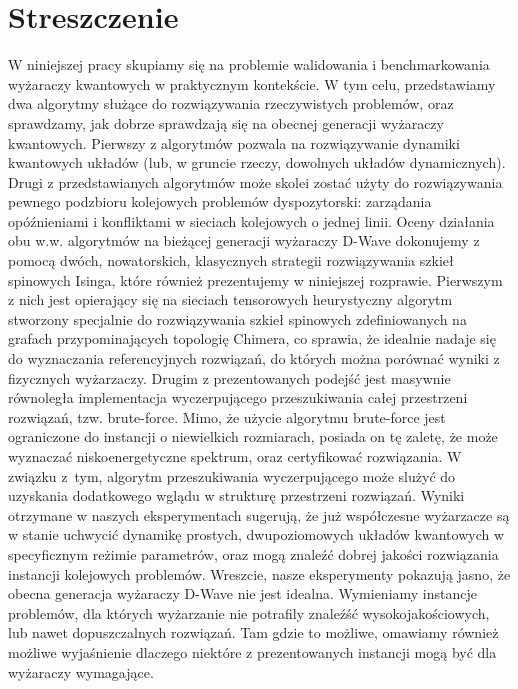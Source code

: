\chapter{Streszczenie}

\begin{otherlanguage}{polish}
  W niniejszej pracy skupiamy się na problemie walidowania i benchmarkowania
  wyżaraczy kwantowych w praktycznym kontekście. W tym celu, przedstawiamy dwa
  algorytmy służące do rozwiązywania rzeczywistych problemów, oraz sprawdzamy,
  jak dobrze sprawdzają się na obecnej generacji wyżaraczy kwantowych. Pierwszy z
  algorytmów pozwala na rozwiązywanie dynamiki kwantowych układów (lub, w gruncie
  rzeczy, dowolnych układów dynamicznych). Drugi z przedstawianych algorytmów
  może skolei zostać użyty do rozwiązywania pewnego podzbioru kolejowych
  problemów dyspozytorski: zarządania opóźnieniami i konfliktami w sieciach
  kolejowych o jednej linii. Oceny działania obu w.w. algorytmów na bieżącej
  generacji wyżaraczy D-Wave dokonujemy z pomocą dwóch, nowatorskich, klasycznych
  strategii rozwiązywania szkieł spinowych Isinga, które również prezentujemy w
  niniejszej rozprawie. Pierwszym z nich jest opierający się na sieciach tensorowych
  heurystyczny algorytm stworzony specjalnie do rozwiązywania szkieł spinowych
  zdefiniowanych na grafach przypominających topologię Chimera, co sprawia, że
  idealnie nadaje się do wyznaczania referencyjnych rozwiązań, do których można
  porównać wyniki z fizycznych wyżarzaczy. Drugim z prezentowanych podejść jest
  masywnie równoległa implementacja wyczerpującego przeszukiwania całej
  przestrzeni rozwiązań, tzw. brute-force. Mimo, że użycie algorytmu brute-force
  jest ograniczone do instancji o niewielkich rozmiarach, posiada on tę zaletę,
  że może wyznaczać niskoenergetyczne spektrum, oraz certyfikować rozwiązania. W
  związku z~tym, algorytm przeszukiwania wyczerpującego może slużyć do uzyskania
  dodatkowego wglądu w strukturę przestrzeni rozwiązań. Wyniki otrzymane w
  naszych eksperymentach sugerują, że już współczesne wyżarzacze są w stanie
  uchwycić dynamikę prostych, dwupoziomowych układów kwantowych w specyficznym
  reżimie parametrów, oraz mogą znaleźć dobrej jakości rozwiązania instancji
  kolejowych problemów. Wreszcie, nasze eksperymenty pokazują jasno, że obecna
  generacja wyżaraczy D-Wave nie jest idealna. Wymieniamy instancje problemów,
  dla których wyżarzanie nie potrafily znaleźść wysokojakościowych, lub nawet
  dopuszczalnych rozwiązań. Tam gdzie to możliwe, omawiamy również możliwe
  wyjaśnienie dlaczego niektóre z prezentowanych instancji mogą być dla wyżaraczy
  wymagające.
\end{otherlanguage}

